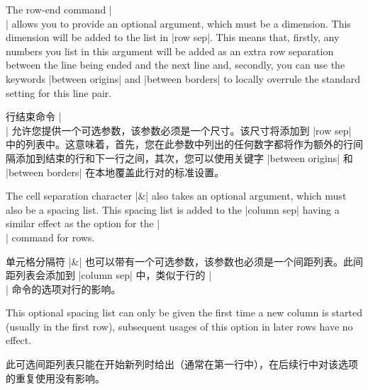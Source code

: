 The row-end command |\\| allows you to provide an optional argument, which must
be a dimension. This dimension will be added to the list in |row sep|. This
means that, firstly, any numbers you list in this argument will be added as an
extra row separation between the line being ended and the next line and,
secondly, you can use the keywords |between origins| and |between borders| to
locally overrule the standard setting for this line pair.
%

行结束命令 |\\| 允许您提供一个可选参数，该参数必须是一个尺寸。该尺寸将添加到 |row sep| 中的列表中。这意味着，首先，您在此参数中列出的任何数字都将作为额外的行间隔添加到结束的行和下一行之间，其次，您可以使用关键字 |between origins| 和 |between borders| 在本地覆盖此行对的标准设置。

\begin{codeexample}[]
\end{codeexample}

The cell separation character |&| also takes an optional argument, which must
also be a spacing list. This spacing list is added to the |column sep| having a
similar effect as the option for the |\\| command for rows.

单元格分隔符 |&| 也可以带有一个可选参数，该参数也必须是一个间距列表。此间距列表会添加到 |column sep| 中，类似于行的 |\\| 命令的选项对行的影响。

This optional spacing list can only be given the first time a new column is
started (usually in the first row), subsequent usages of this option in later
rows have no effect.

此可选间距列表只能在开始新列时给出（通常在第一行中），在后续行中对该选项的重复使用没有影响。

